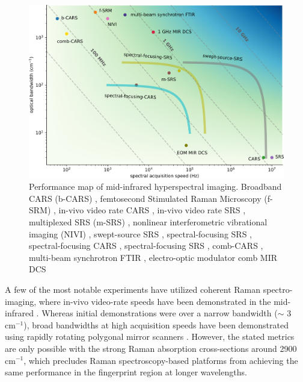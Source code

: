 \documentclass{optica-article}
\begin{document}
\begin{figure}[h]
    \centering
    \includegraphics[width=\linewidth]{bckgnd_with_cm.png}
    \caption{Performance map of mid-infrared hyperspectral imaging. Broadband CARS (b-CARS) \cite{kee_simple_2004}, femtosecond Stimulated Raman Microscopy (f-SRM) \cite{ploetz_femtosecond_2007}, in-vivo video rate CARS \cite{evans_chemical_2005}, in-vivo video rate SRS \cite{saar_video-rate_2010}, multiplexed SRS (m-SRS) \cite{fu_quantitative_2012,liao_microsecond_2015}, nonlinear interferometric vibrational imaging (NIVI) \cite{chowdary_molecular_2010}, swept-source SRS \cite{ozeki_high-speed_2012}, spectral-focusing SRS \cite{fu_hyperspectral_2013}, spectral-focusing CARS \cite{di_napoli_hyperspectral_2014}, spectral-focusing SRS \cite{lin_microsecond_2021}, comb-CARS \cite{ideguchi_coherent_2013}, multi-beam synchrotron FTIR \cite{nasse_high-resolution_2011}, electro-optic modulator comb MIR DCS \cite{ullah_khan_direct_2020}}
    \label{fig:bckgnd}
\end{figure}

A few of the most notable experiments have utilized coherent Raman spectro-imaging, where in-vivo video-rate speeds have been demonstrated in the mid-infrared \cite{evans_chemical_2005, saar_video-rate_2010}. Whereas initial demonstrations were over a narrow bandwidth ($\sim$ 3  $\mathrm{cm^{-1}}$), broad bandwidths at high acquisition speeds have been demonstrated using rapidly rotating polygonal mirror scanners \cite{tamamitsu_ultrafast_2017, lin_microsecond_2021}. However, the stated metrics are only possible with the strong Raman absorption cross-sections around 2900~$\mathrm{cm^{-1}}$, which precludes Raman spectroscopy-based platforms from achieving the same performance in the fingerprint region at longer wavelengths.
\end{document}
